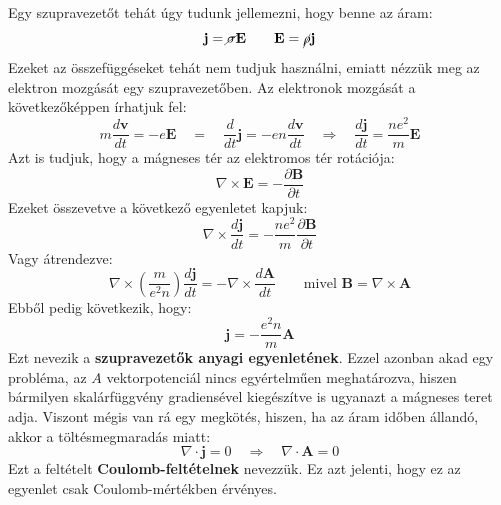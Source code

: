 \documentclass[../main.tex]{subfiles}
\begin{document}
Egy szupravezetőt tehát úgy tudunk jellemezni, hogy benne az áram:
\begin{equation}
    \mathbf{j} = \cancel{\sigma} \mathbf{E} \qquad \mathbf{E} = \cancel{\rho} \mathbf{j}
\end{equation} 
Ezeket az összefüggéseket tehát nem tudjuk használni, emiatt nézzük meg az elektron mozgását egy szupravezetőben. Az elektronok mozgását a következőképpen írhatjuk fel:
\begin{equation}
    m \frac{d \mathbf{v}}{dt} = - e \mathbf{E} \quad = \quad \frac{d}{dt} \mathbf{j} = - e n \frac{d\mathbf{v}}{dt} \quad \Rightarrow \quad \frac{d \mathbf{j}}{dt} = \frac{n e^2}{m} \mathbf{E}
\end{equation}
Azt is tudjuk, hogy a mágneses tér az elektromos tér rotációja:
\begin{equation}
    \nabla \times \mathbf{E} = - \frac{\partial \mathbf{B}}{\partial t}
\end{equation}
Ezeket összevetve a következő egyenletet kapjuk:
\begin{equation}
    \nabla \times \frac{d \mathbf{j}}{dt} = - \frac{n e^2}{m} \frac{\partial \mathbf{B}}{\partial t}
\end{equation}
Vagy átrendezve:
\begin{equation}
    \nabla \times (\frac{m}{e^2 n}) \frac{d \mathbf{j}}{dt} = - \nabla \times \frac{d \mathbf{A}}{dt} \qquad \text{mivel } \mathbf{B} = \nabla \times \mathbf{A}
\end{equation}
Ebből pedig következik, hogy:
\begin{equation}
    \boxed{\mathbf{j} = - \frac{e^2 n}{m} \mathbf{A}}
\end{equation}
Ezt nevezik a \textbf{szupravezetők anyagi egyenletének}. Ezzel azonban akad egy probléma, az $A$ vektorpotenciál nincs egyértelműen meghatározva, hiszen bármilyen skalárfüggvény gradiensével kiegészítve is ugyanazt a mágneses teret adja.
Viszont mégis van rá egy megkötés, hiszen, ha az áram időben állandó, akkor a töltésmegmaradás miatt:
\begin{equation}
    \nabla \cdot \mathbf{j} = 0 \quad \Rightarrow \quad \nabla \cdot \mathbf{A} = 0
\end{equation}
Ezt a feltételt \textbf{Coulomb-feltételnek} nevezzük. Ez azt jelenti, hogy ez az egyenlet csak Coulomb-mértékben érvényes. 
\end{document}
